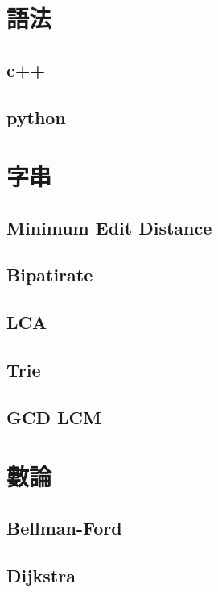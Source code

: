 \section{語法}
    \subsection{c++}
        
    \subsection{python}
        
        
\section{字串}
    \subsection{Minimum Edit Distance}
        
    \subsection{Bipatirate}
        
    \subsection{LCA}
        
    \subsection{Trie}
        
    \subsection{GCD LCM}
        
    
\section{數論}
    \subsection{Bellman-Ford}
        
    \subsection{Dijkstra}
        
